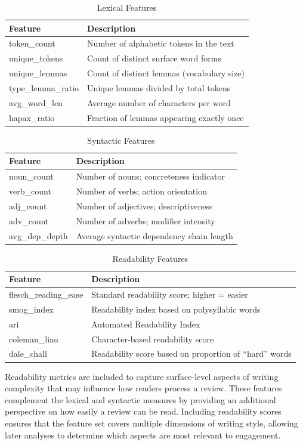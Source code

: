 \documentclass[12pt]{article}
\begin{document}
\begin{longtable}{ll}
\caption{Lexical Features} \\
\textbf{Feature} & \textbf{Description} \\
\hline
token\_count & Number of alphabetic tokens in the text \\
unique\_tokens & Count of distinct surface word forms \\
unique\_lemmas & Count of distinct lemmas (vocabulary size) \\
type\_lemma\_ratio & Unique lemmas divided by total tokens \\
avg\_word\_len & Average number of characters per word \\
hapax\_ratio & Fraction of lemmas appearing exactly once \\
\end{longtable}

\begin{longtable}{ll}
\caption{Syntactic Features} \\
\textbf{Feature} & \textbf{Description} \\
\hline
noun\_count & Number of nouns; concreteness indicator \\
verb\_count & Number of verbs; action orientation \\
adj\_count & Number of adjectives; descriptiveness \\
adv\_count & Number of adverbs; modifier intensity \\
avg\_dep\_depth & Average syntactic dependency chain length \\
\end{longtable}

\begin{longtable}{ll}
\caption{Readability Features} \\
\textbf{Feature} & \textbf{Description} \\
\hline
flesch\_reading\_ease & Standard readability score; higher = easier \\
smog\_index & Readability index based on polysyllabic words \\
ari & Automated Readability Index \\
coleman\_liau & Character-based readability score \\
dale\_chall & Readability score based on proportion of “hard” words \\
\end{longtable}

Readability metrics are included to capture surface-level aspects of writing complexity that may influence how readers process a review. These features complement the lexical and syntactic measures by providing an additional perspective on how easily a review can be read. Including readability scores ensures that the feature set covers multiple dimensions of writing style, allowing later analyses to determine which aspects are most relevant to engagement.
\end{document}
